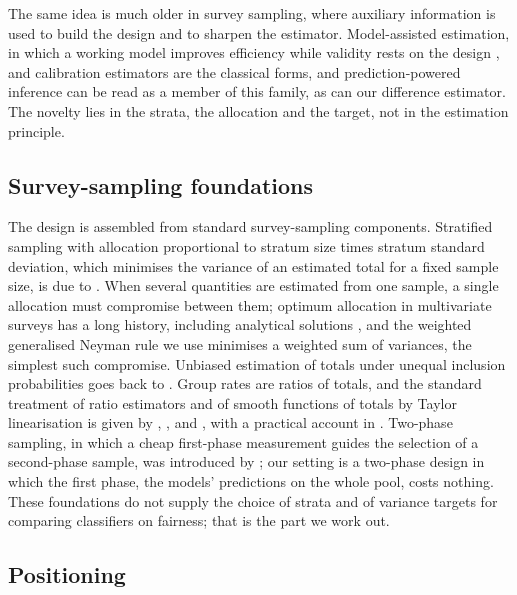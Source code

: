 \documentclass[pdflatex,sn-mathphys-num,iicol]{sn-jnl}
\theoremstyle{thmstyleone}
\theoremstyle{thmstyletwo}
\theoremstyle{thmstylethree}
\begin{document}
The same idea is much older in survey sampling, where auxiliary information is used to build the design and to sharpen the estimator. Model-assisted estimation, in which a working model improves efficiency while validity rests on the design \citep{sarndal1992,breidt2017}, and calibration estimators \citep{deville1992} are the classical forms, and prediction-powered inference can be read as a member of this family, as can our difference estimator. The novelty lies in the strata, the allocation and the target, not in the estimation principle.

\subsection{Survey-sampling foundations}

The design is assembled from standard survey-sampling components. Stratified sampling with allocation proportional to stratum size times stratum standard deviation, which minimises the variance of an estimated total for a fixed sample size, is due to \citet{neyman1934}. When several quantities are estimated from one sample, a single allocation must compromise between them; optimum allocation in multivariate surveys has a long history, including analytical solutions \citep{kokan1967}, and the weighted generalised Neyman rule we use minimises a weighted sum of variances, the simplest such compromise. Unbiased estimation of totals under unequal inclusion probabilities goes back to \citet{horvitz1952}. Group rates are ratios of totals, and the standard treatment of ratio estimators and of smooth functions of totals by Taylor linearisation is given by \citet{woodruff1971}, \citet{binder1983}, \citet{sarndal1992} and \citet{wolter2007}, with a practical account in \citet{lumley2010}. Two-phase sampling, in which a cheap first-phase measurement guides the selection of a second-phase sample, was introduced by \citet{neyman1938}; our setting is a two-phase design in which the first phase, the models' predictions on the whole pool, costs nothing. These foundations do not supply the choice of strata and of variance targets for comparing classifiers on fairness; that is the part we work out.

\subsection{Positioning}
\end{document}

